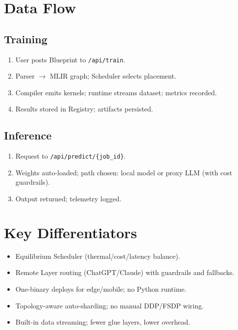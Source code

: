 \documentclass[11pt]{article}
\begin{document}
\section{Data Flow}
\subsection{Training}
\begin{enumerate}
  \item User posts Blueprint to \texttt{/api/train}.
  \item Parser $\rightarrow$ MLIR graph; Scheduler selects placement.
  \item Compiler emits kernels; runtime streams dataset; metrics recorded.
  \item Results stored in Registry; artifacts persisted.
\end{enumerate}

\subsection{Inference}
\begin{enumerate}
  \item Request to \texttt{/api/predict/\{job\_id\}}.
  \item Weights auto-loaded; path chosen: local model or proxy LLM (with cost guardrails).
  \item Output returned; telemetry logged.
\end{enumerate}

\section{Key Differentiators}
\begin{itemize}
  \item Equilibrium Scheduler (thermal/cost/latency balance).
  \item Remote Layer routing (ChatGPT/Claude) with guardrails and fallbacks.
  \item One-binary deploys for edge/mobile; no Python runtime.
  \item Topology-aware auto-sharding; no manual DDP/FSDP wiring.
  \item Built-in data streaming; fewer glue layers, lower overhead.
\end{itemize}
\end{document}
